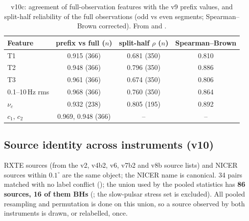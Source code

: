 \begin{table}[htbp]
\centering\small
\caption[NICER full-observation quality]{v10c: agreement of full-observation features with the v9 prefix values, and split-half
reliability of the full observations (odd vs even segments; Spearman--Brown corrected). From 
and .}
\label{tab:p5full}
\begin{tabular}{@{}lccc@{}}
\toprule
Feature & prefix vs full ($n$) & split-half $\rho$ ($n$) & Spearman--Brown \\
\midrule
T1 & 0.915 (366) & 0.681 (350) & 0.810 \\
T2 & 0.948 (366) & 0.796 (350) & 0.886 \\
T3 & 0.961 (366) & 0.674 (350) & 0.806 \\
0.1--10\,Hz rms & 0.968 (366) & 0.760 (350) & 0.864 \\
$\nu_c$ & 0.932 (238) & 0.805 (195) & 0.892 \\
$c_1$, $c_2$ & 0.969, 0.948 (366) & -- & -- \\
\bottomrule
\end{tabular}
\end{table}

\subsection{Source identity across instruments (v10)}
RXTE sources (from the v2, v4b2, v6, v7b2 and v8b source lists) and NICER sources within $0.1^\circ$ are the same object; the NICER
name is canonical. 34 pairs matched with no label conflict (); the union used by the pooled
statistics has \textbf{86 sources, 16 of them BHs} (; the slow-pulsar stress set is excluded). All
pooled resampling and permutation is done on this union, so a source observed by both instruments is drawn, or relabelled, once.


